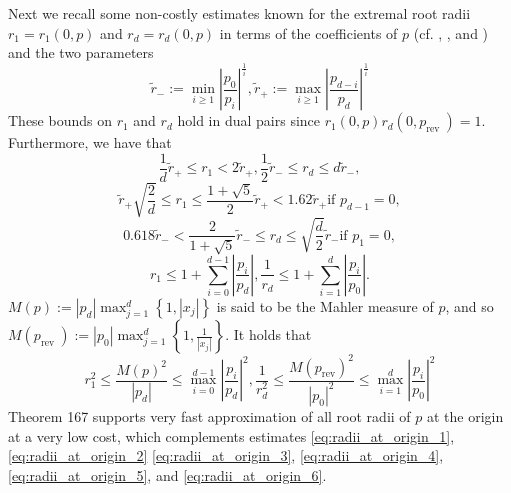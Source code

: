\documentclass[sigconf]{acmart}
\begin{document}
Next we recall some non-costly estimates known for the extremal root radii $r_{1}=r_{1}(0, p)$ and $r_{d}=r_{d}(0, p)$ in terms of the coefficients of $p$ (cf. \cite{kerimov1977applied}, \cite{mignotte1999polynomials}, and \cite{yap2000fundamental}) and the two parameters
\begin{equation}\label{eq:radii_at_origin_1}
\tilde{r}_{-}:=\min _{i \geq 1}\left|\frac{p_{0}}{p_{i}}\right|^{\frac{1}{i}}, \tilde{r}_{+}:=\max _{i \geq 1}\left|\frac{p_{d-i}}{p_{d}}\right|^{\frac{1}{i}}
\end{equation}
These bounds on $r_{1}$ and $r_{d}$ hold in dual pairs since $r_{1}(0, p) r_{d}\left(0, p_{\text {rev }}\right)=1$.
Furthermore, we have that
\begin{equation}\label{eq:radii_at_origin_2}
\frac{1}{d} \tilde{r}_{+} \leq r_{1}<2 \tilde{r}_{+}, \frac{1}{2} \tilde{r}_{-} \leq r_{d} \leq d \tilde{r}_{-},
\end{equation}
\begin{equation}\label{eq:radii_at_origin_3}
\tilde{r}_{+} \sqrt{\frac{2}{d}} \leq r_{1} \leq \frac{1+\sqrt{5}}{2} \tilde{r}_{+}<1.62 \tilde{r}_{+} \text {if } p_{d-1}=0,
\end{equation}
\begin{equation}\label{eq:radii_at_origin_4}
0.618 \tilde{r}_{-}<\frac{2}{1+\sqrt{5}} \tilde{r}_{-} \leq r_{d} \leq \sqrt{\frac{d}{2}} \tilde{r}_{-} \text {if } p_{1}=0,
\end{equation}
\begin{equation}\label{eq:radii_at_origin_5}
r_{1} \leq 1+\sum_{i=0}^{d-1}\left|\frac{p_{i}}{p_{d}}\right|, \frac{1}{r_{d}} \leq 1+\sum_{i=1}^{d}\left|\frac{p_{i}}{p_{0}}\right| .
\end{equation}
$M(p):=\left|p_{d}\right| \max _{j=1}^{d}\left\{1,\left|x_{j}\right|\right\}$ is said to be the Mahler measure of $p$, and so $M\left(p_{\text {rev }}\right):=\left|p_{0}\right| \max _{j=1}^{d}\left\{1, \frac{1}{\left|x_{j}\right|}\right\} .$ It holds that
\begin{equation}\label{eq:radii_at_origin_6}
r_{1}^{2} \leq \frac{M(p)^{2}}{\left|p_{d}\right|} \leq \max _{i=0}^{d-1}\left|\frac{p_{i}}{p_{d}}\right|^{2}, \frac{1}{r_{d}^{2}} \leq \frac{M\left(p_{\mathrm{rev}}\right)^{2}}{\left|p_{0}\right|^{2}} \leq \max _{i=1}^{d}\left|\frac{p_{i}}{p_{0}}\right|^{2}
\end{equation}
Theorem 167 supports very fast approximation of all root radii of $p$ at the origin at a very low cost, which complements estimates \ref{eq:radii_at_origin_1}, \ref{eq:radii_at_origin_2} \ref{eq:radii_at_origin_3}, \ref{eq:radii_at_origin_4}, \ref{eq:radii_at_origin_5}, and \ref{eq:radii_at_origin_6}.
\end{document}
